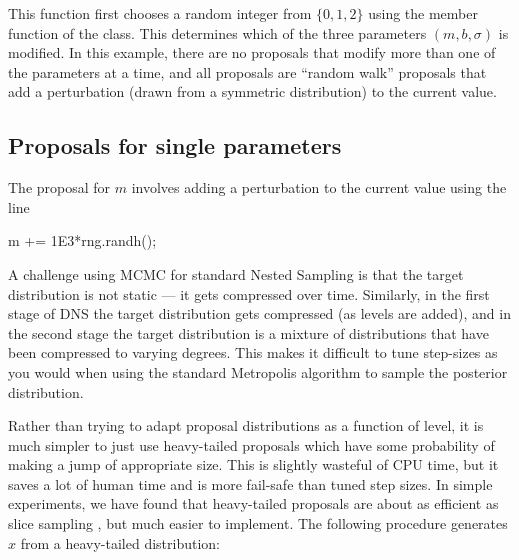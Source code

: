 \documentclass[article, nojss]{jss}
\begin{document}
This function first chooses a random integer from $\{0, 1, 2\}$ using the
 member function of the  class.
This determines which of the three parameters
$(m, b, \sigma)$ is modified. In this example, there are no proposals
that modify more than one of the parameters at a time, and all proposals
are ``random walk'' proposals that add a perturbation
(drawn from a symmetric distribution) to the current value.

\subsection{Proposals for single parameters}\label{sec:proposals}
The proposal for $m$ involves adding a perturbation to the current
value using the line

\begin{CodeChunk}
\begin{CodeInput}
m += 1E3*rng.randh();
\end{CodeInput}
\end{CodeChunk}

A challenge using MCMC for standard Nested Sampling is that the target
distribution is not static --- it gets compressed over time. Similarly, in
the first stage of DNS the target distribution gets compressed (as levels are
added), and in the second stage the target distribution is a mixture of
distributions that have been compressed to varying degrees.
This makes it difficult to tune step-sizes as you would when using
the standard Metropolis algorithm to sample the posterior distribution.

Rather than trying to adapt proposal distributions as a function of level,
it is much simpler to just use heavy-tailed proposals which have some
probability of making a jump of appropriate size. This is slightly
wasteful of CPU time, but it saves a lot of human time and is more
fail-safe than tuned step sizes.
In simple experiments, we have found that heavy-tailed proposals are
about as efficient as slice sampling \citep{neal2003slice}, but much easier to
implement. The following procedure generates
$x$ from a heavy-tailed distribution:
\end{document}
